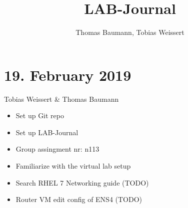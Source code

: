 \documentclass{report}
\title{LAB-Journal}
\author{Thomas Baumann, Tobias Weissert}
\begin{document}
\maketitle
\pagebreak
\section*{19. February 2019}
	Tobias Weissert \& Thomas Baumann
	\begin{itemize}
		\item Set up Git repo
		\item Set up LAB-Journal
		\item Group assingment nr: n113
		\item Familiarize with the virtual lab setup
		\item Search RHEL 7 Networking guide (TODO)
		\item Router VM edit config of ENS4 (TODO)
	\end{itemize}
\end{document}
